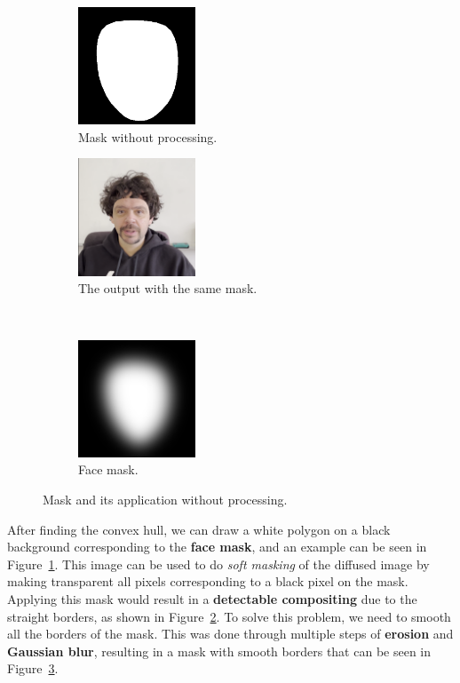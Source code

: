 \documentclass[preprint]{elsarticle}
\begin{document}
\begin{figure}[t]
	\centering
	\begin{subfigure}[b]{0.5\textwidth}
		\centering
		\includegraphics[width=3.5cm, keepaspectratio]{img/project_img/mask.png}
		\caption{Mask without processing.}\label{fig:mask-noblur}
	\end{subfigure}%
	\hfill
	\begin{subfigure}[b]{0.5\textwidth}
		\centering
		\includegraphics[width=3.5cm, keepaspectratio]{img/project_img/final-erorr.png}
		\caption{The output with the same mask.}\label{fig:mask-final-error}
	\end{subfigure}
 \\ \vspace{0.4cm}
 	\begin{subfigure}[b]{0.5\textwidth}
		\centering
		\includegraphics[width=3.5cm, keepaspectratio]{img/project_img/mask-blur.png}
		\caption{Face mask.}\label{fig:mask}
	\end{subfigure}
 \caption{Mask and its application without processing.}\label{fig:eroor-mediapipe}
\end{figure}


After finding the convex hull, we can draw a white polygon on a black background corresponding to the \textbf{face mask},  and an example can be seen in Figure~\ref{fig:mask-noblur}. 
This image can be used to do \emph{soft masking} of the diffused image by making transparent all  pixels corresponding to a black pixel on the mask.  Applying this mask would result in a \textbf{detectable compositing} due to the straight borders, 
as shown in Figure~\ref{fig:mask-final-error}.  To solve this problem, we need to smooth all the borders of the mask.  This was done through multiple steps of \textbf{erosion} and \textbf{Gaussian blur}, 
resulting in a mask with smooth borders that can be seen in Figure~\ref{fig:mask}.
\end{document}
